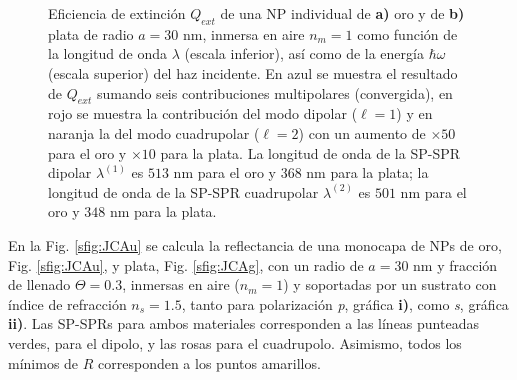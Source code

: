 \begin{figure}[h!]
	\caption{Eficiencia de extinción $Q_{ext}$ de una NP individual de \textbf{a)} oro y de \textbf{b)} plata de radio $a = 30$ nm, inmersa en aire $n_m = 1$ como función de la longitud de onda $\lambda$ (escala inferior), así como de la energía $\hbar\omega$ (escala superior) del haz incidente. En azul se muestra el resultado de $Q_{ext}$ sumando seis contribuciones multipolares (convergida), en rojo se muestra la contribución del modo dipolar ($\ell = 1$) y en naranja la del modo cuadrupolar ($\ell = 2$) con un aumento de $\times 50$ para el oro y $\times 10$ para la plata. La longitud de onda de la SP-SPR dipolar $\lambda^{(1)}$ es $513$ nm para el oro y $368$ nm para la plata; la longitud de onda de la SP-SPR cuadrupolar $\lambda^{(2)}$  es $501$ nm para el oro y $348$ nm para la plata.
	 }\label{fig:Q-ext}
	\end{figure}	



En la Fig. \ref{sfig:JCAu} se calcula la reflectancia de una monocapa de NPs de oro, Fig. \ref{sfig:JCAu}, y plata, Fig. \ref{sfig:JCAg}, con un radio de $a=30$ nm y fracción de llenado $\Theta = 0.3$, inmersas en aire ($n_m = 1$) y soportadas por un sustrato con índice de refracción $n_s = 1.5$, tanto para polarización \emph{p}, gráfica \textbf{i)}, como \emph{s}, gráfica \textbf{ii)}. Las SP-SPRs para ambos materiales corresponden a las líneas punteadas verdes, para el dipolo, y las rosas para el cuadrupolo. Asimismo, todos los mínimos de $R$ corresponden a los puntos amarillos. 

